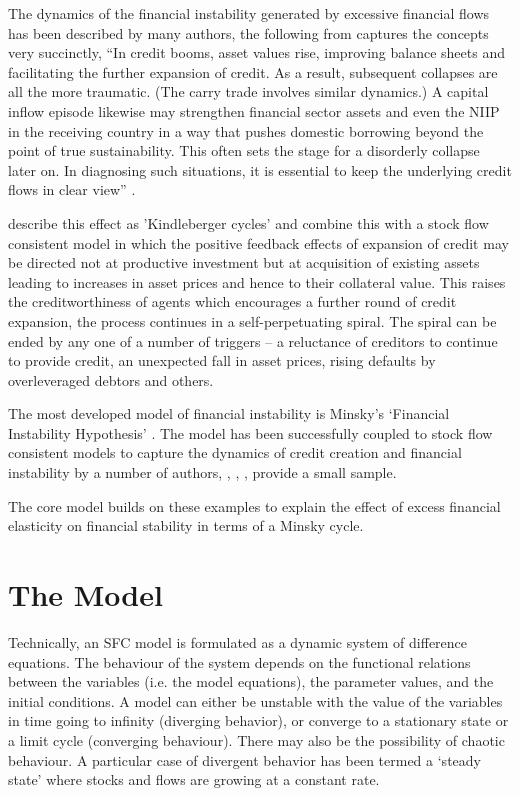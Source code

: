 \documentclass[twoside,a4paper,11pt]{article}
\begin{document}
The dynamics of the financial instability generated by excessive financial flows has been described by many authors, the following from \cite{Obstfeld2012a} captures the concepts very succinctly, ``In credit booms, asset values rise, improving balance sheets and facilitating the further expansion of credit. As a result, subsequent collapses are all the more traumatic. (The carry trade involves similar dynamics.) A capital inflow episode likewise may strengthen financial sector assets and even the NIIP in the receiving country in a way that pushes domestic borrowing beyond the point of true sustainability. This often sets the stage for a disorderly collapse later on. In diagnosing such situations, it is essential to keep the underlying credit flows in clear view'' \cite[:p479]{Obstfeld2012a}.

\cite{Miess2015} describe this effect as  'Kindleberger cycles' and combine this with a stock flow consistent model in which the positive feedback effects of expansion of credit may be directed not at productive investment but at acquisition of existing assets leading to increases in asset prices and hence to their collateral value. This raises the creditworthiness of agents which encourages a further round of credit expansion, the process continues in a self-perpetuating spiral. The spiral can be ended by any one of a number of triggers -- a reluctance of creditors to continue to provide credit, an unexpected fall in asset prices, rising defaults by overleveraged debtors and others.

The most developed model of financial instability is Minsky's `Financial Instability Hypothesis' \cite{Minsky1986}. The model has been successfully coupled to stock flow consistent models to capture the dynamics of credit creation and financial instability by a number of authors, \cite{Caverzasi2015b}, \cite{Bezemer2011}, \cite{DosSantos2004}, \cite{Dafermos2015a}  provide a small sample.

The core model builds on these examples to explain the effect of excess financial elasticity on financial stability in terms of a Minsky cycle. 

\section{The Model}
Technically, an SFC model is formulated as a dynamic system of difference equations.
The behaviour of the system depends on the functional relations between the
variables (i.e. the model equations), the parameter values, and the initial conditions. A
model can either be unstable with the value of the variables in time going to infinity
(diverging behavior), or converge to a stationary state or a limit cycle (converging behaviour). There may also be the possibility of chaotic behaviour. A particular case of divergent behavior has been termed a `steady state' \cite[:p9]{Caverzasi2014a} where stocks and flows are growing at a constant rate.
\end{document}
